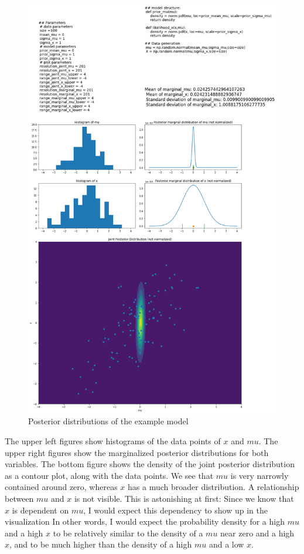 \documentclass{article}
\begin{document}
\begin{figure}
	\includegraphics[width=\textwidth]{images/ground_truth_posterior_1.png}
	\caption[Posterior distributions of the example model]{Posterior distributions of the example model}
	\label{fig:ground_truth_posterior_1}
\end{figure}
The upper left figures show histograms of the data points of $x$ and $mu$. The upper right figures show the marginalized posterior distributions for both variables. The bottom figure shows the density of the joint posterior distribution as a contour plot, along with the data points. We see that $mu$ is very narrowly contained around zero, whereas $x$ has a much broader distribution. A relationship between $mu$ and $x$ is not visible. This is astonishing at first: Since we know that $x$ is dependent on $mu$, I would expect this dependency to show up in the visualization In other words, I would expect the probability density for a high $mu$ and a high $x$ to be relatively similar to the density of a $mu$ near zero and a high $x$, and to be much higher than the density of a high $mu$ and a low $x$.
\end{document}
